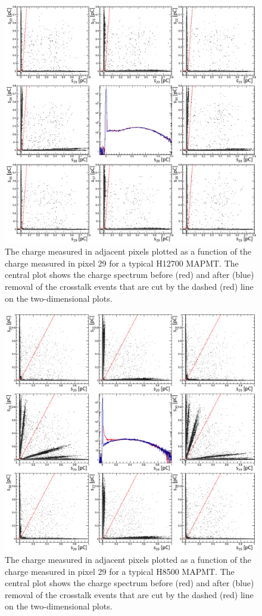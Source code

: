 \begin{figure}[h!bt]
	\centering
	\includegraphics[width=0.9\linewidth]{figures/H12700_ct_updated.png}
	\caption{The charge measured in adjacent pixels plotted as a function of the charge measured in pixel 29 for a typical H12700 MAPMT. The central plot shows the charge spectrum before (red) and after (blue) removal of the crosstalk events that are cut by the dashed (red) line on the two-dimensional plots.}
	\label{fig:H12700neighbors}
\end{figure}
\begin{figure}[h!bt]
    \centering
	\includegraphics[width=0.9\linewidth]{figures/H8500_ct_updated.png}
	\caption{The charge measured in adjacent pixels plotted as a function of the charge measured in pixel 29 for a typical H8500 MAPMT. The central plot shows the charge spectrum before (red) and after (blue) removal of the crosstalk events that are cut by the dashed (red) line on the two-dimensional plots.}
	\label{fig:H8500neighbors}
\end{figure}

